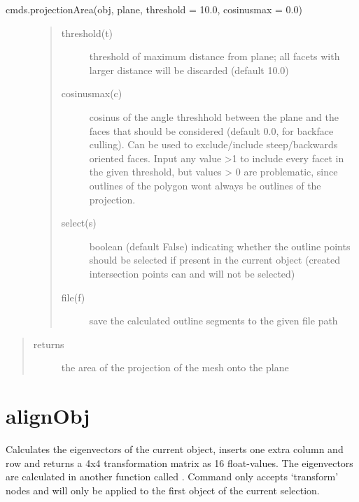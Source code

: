 \documentclass[letterpaper,10pt,english]{sphinxmanual}
\begin{document}
 cmds.projectionArea(obj, plane, threshold = 10.0, cosinusmax = 0.0)
\begin{description}
\item[{}] \leavevmode\begin{quote}\begin{description}
\item[{threshold(t)}] \leavevmode
threshold of maximum distance from plane; all facets with larger distance will be discarded
(default 10.0)

\item[{cosinusmax(c)}] \leavevmode
cosinus of the angle threshhold between the plane and the faces that should be considered
(default 0.0, for backface culling). Can be used to exclude/include steep/backwards oriented faces.
Input any value \textgreater{}1 to include every facet in the given threshold, but values \textgreater{} 0 are problematic, since outlines
of the polygon wont always be outlines of the projection.

\item[{select(s)}] \leavevmode
boolean (default False) indicating whether the outline points should be selected if present in the
current object (created intersection points can and will not be selected)

\item[{file(f)}] \leavevmode
save the calculated outline segments to the given file path

\end{description}\end{quote}

\end{description}
\begin{quote}\begin{description}
\item[{returns}] \leavevmode
the area of the projection of the mesh onto the plane

\end{description}\end{quote}


\section{alignObj}
\label{\detokenize{pk_src.alignObj::doc}}\label{\detokenize{pk_src.alignObj:alignobj}}\label{\detokenize{pk_src.alignObj:id1}}
{\hyperref[\detokenize{index:commands}]{}}
\label{\detokenize{pk_src.alignObj:module-pk_src.alignObj}}
Calculates the eigenvectors of the current object, inserts one extra column and row and returns a 4x4 transformation matrix as 16 float-values. The eigenvectors are calculated in another function called {\hyperref[\detokenize{pk_src.eigenvector:eigenvector}]{}}.
Command only accepts ‘transform’ nodes and will only be applied to the first object of the current selection.
\end{document}
